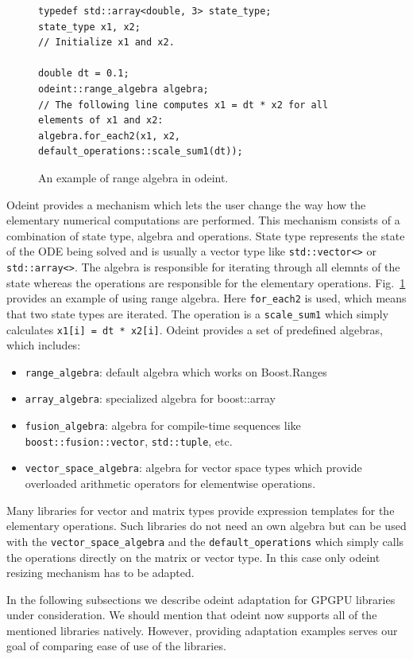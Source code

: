\documentclass[1p]{elsarticle}
\newcommand{\code}[1]{\lstinline|#1|}
\newcommand{\figref}[1]{Fig.~\ref{#1}}
\begin{document}
\begin{figure}
\begin{lstlisting}
typedef std::array<double, 3> state_type;
state_type x1, x2;
// Initialize x1 and x2.

double dt = 0.1;
odeint::range_algebra algebra;
// The following line computes x1 = dt * x2 for all elements of x1 and x2:
algebra.for_each2(x1, x2, default_operations::scale_sum1(dt));
\end{lstlisting}
\caption{An example of range algebra in odeint.}
\label{fig:odeintops}
\end{figure}

Odeint provides a mechanism which lets the user change the way how the
elementary numerical computations are performed. This mechanism consists of a
combination of state type, algebra and operations. State type represents the
state of the ODE being solved and is usually a vector type like
\code{std::vector<>} or \code{std::array<>}. The algebra is responsible for
iterating through all elemnts of the state whereas the operations are
responsible for the elementary operations. \figref{fig:odeintops} provides an
example of using range algebra. Here \code{for_each2} is used, which means that
two state types are iterated. The operation is a \code{scale_sum1} which simply
calculates \code{x1[i] = dt * x2[i]}. Odeint provides a set of predefined
algebras, which includes:
\begin{itemize}
    \item \code{range_algebra}: default algebra which works on Boost.Ranges
    \item \code{array_algebra}: specialized algebra for boost::array
    \item \code{fusion_algebra}: algebra for compile-time sequences like
	\code{boost::fusion::vector}, \code{std::tuple}, etc.
    \item \code{vector_space_algebra}: algebra for vector space types which
	provide overloaded arithmetic operators for elementwise operations.
\end{itemize}

Many libraries for vector and matrix types provide expression templates for the
elementary operations. Such libraries do not need an own algebra but can be
used with the \code{vector_space_algebra} and the \code{default_operations}
which simply calls the operations directly on the matrix or vector type. In
this case only odeint resizing mechanism has to be adapted.

In the following subsections we describe odeint adaptation for GPGPU libraries
under consideration. We should mention that odeint now supports all of the
mentioned libraries natively. However, providing adaptation examples serves our
goal of comparing ease of use of the libraries.
\end{document}
